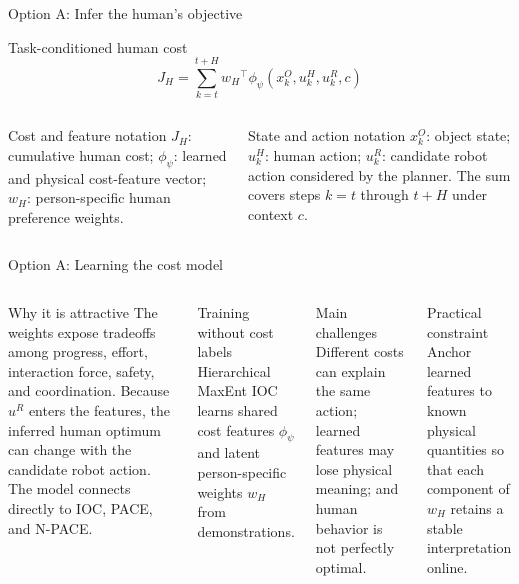 \documentclass[aspectratio=169,11pt]{beamer}
\begin{document}
\begin{frame}{Option A: Infer the human's objective}
\begin{block}{Task-conditioned human cost}
\[
J_H=\sum_{k=t}^{t+H}{w_H}^{\!\top}
\phi_\psi(x_k^O,u_k^H,u_k^R,c)
\]
\end{block}
\begin{columns}[T,onlytextwidth]
\begin{block}{Cost and feature notation}
$J_H$: cumulative human cost; $\phi_\psi$: learned and physical cost-feature vector; $w_H$: person-specific human preference weights.
\end{block}
\begin{block}{State and action notation}
$x_k^O$: object state; $u_k^H$: human action; $u_k^R$: candidate robot action considered by the planner. The sum covers steps $k=t$ through $t+H$ under context $c$.
\end{block}
\end{columns}
\end{frame}

\begin{frame}{Option A: Learning the cost model}
\begin{columns}[T,onlytextwidth]
\begin{exampleblock}{Why it is attractive}
The weights expose tradeoffs among progress, effort, interaction force, safety, and coordination. Because $u^R$ enters the features, the inferred human optimum can change with the candidate robot action. The model connects directly to IOC, PACE, and N-PACE.
\end{exampleblock}
\begin{block}{Training without cost labels}
Hierarchical MaxEnt IOC learns shared cost features \(\phi_\psi\) and latent person-specific weights \(w_H\) from demonstrations.
\end{block}
\begin{alertblock}{Main challenges}
Different costs can explain the same action; learned features may lose physical meaning; and human behavior is not perfectly optimal.
\end{alertblock}
\begin{block}{Practical constraint}
Anchor learned features to known physical quantities so that each component of $w_H$ retains a stable interpretation online.
\end{block}
\end{columns}
\end{frame}
\end{document}
